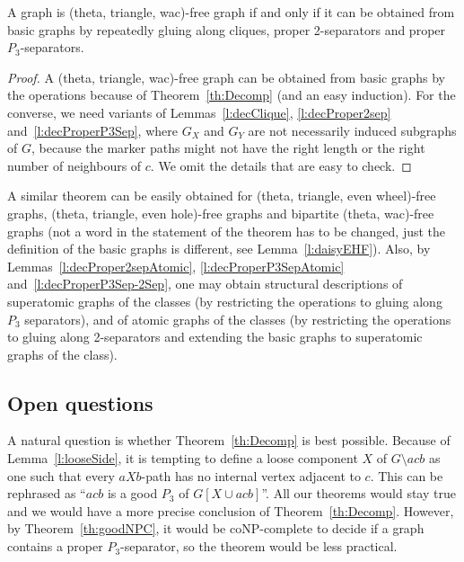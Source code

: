 \documentclass[11pt]{article}
\newcommand{\sm}{\setminus}
\begin{document}
\begin{theo}
  \label{th:struct}
  A graph is (theta, triangle, wac)-free graph if and only if it can be obtained from basic graphs by repeatedly gluing along cliques, proper 2-separators and proper $P_3$-separators.
\end{theo}

\begin{proof}
  A (theta, triangle, wac)-free graph can be obtained from basic graphs by the operations because of Theorem~\ref{th:Decomp} (and an easy induction). For the converse, we need variants of  Lemmas~\ref{l:decClique}, \ref{l:decProper2sep} and~\ref{l:decProperP3Sep}, where  $G_X$ and $G_Y$ are not necessarily induced subgraphs of $G$, because the marker paths might not have the right length or the right number of neighbours of $c$.  We omit the details that are easy to check.    
\end{proof}

A similar theorem can be easily obtained for (theta, triangle, even wheel)-free graphs, (theta, triangle, even hole)-free graphs and bipartite (theta, wac)-free graphs (not a word in the statement of the theorem has to be changed, just the definition of the basic graphs is different, see Lemma~\ref{l:daisyEHF}).  Also, by Lemmas~\ref{l:decProper2sepAtomic}, \ref{l:decProperP3SepAtomic} and~\ref{l:decProperP3Sep-2Sep}, one may obtain structural descriptions of superatomic graphs of the classes (by restricting the operations to gluing along $P_3$ separators), and of atomic graphs of the classes (by restricting the operations to gluing along 2-separators and extending the basic graphs to superatomic graphs of the class).   


\subsection{Open questions}
\label{ssec:conj}

A natural question is whether Theorem~\ref{th:Decomp} is best possible.  Because of Lemma~\ref{l:looseSide}, it is tempting to define a loose component $X$ of $G\sm acb$ as one such that every $aXb$-path has no internal vertex adjacent to $c$.  This can be rephrased as ``$acb$ is a good $P_3$ of $G[X \cup acb]$''.  
All our theorems would stay true and we would have a more precise conclusion of Theorem~\ref{th:Decomp}. 
However, by Theorem~\ref{th:goodNPC}, it would be coNP-complete to decide if a graph contains a proper $P_3$-separator, so the theorem would be less practical. 
\end{document}

